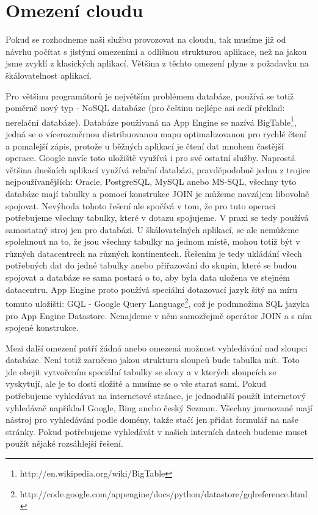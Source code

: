 \section{Omezení cloudu}
Pokud se rozhodneme naši službu provozovat na cloudu, tak musíme již od návrhu počítat s jistými omezeními a odlišnou strukturou aplikace, než na jakou jsme zvyklí z klasických aplikací. Většina z těchto omezení plyne z požadavku na škálovatelnost aplikací.

Pro většinu programátorů je největším problémem databáze, používá se totiž poměrně nový typ - NoSQL databáze (pro češtinu nejlépe asi sedí překlad: nerelační databáze). Databáze používaná na App Engine se nazívá BigTable\footnote{http://en.wikipedia.org/wiki/BigTable}, jedná se o vícerozměrnou distribuovanou mapu optimalizovanou pro rychlé čtení a pomalejší zápis, protože u běžných aplikací je čtení dat mnohem častější operace. Google navíc toto uložiště využívá i pro své ostatní služby. Naprostá většina dnešních aplikací využívá relační databázi, pravděpodobně jednu z trojice nejpoužívanějších: Oracle, PostgreSQL, MySQL anebo MS-SQL, všechny tyto databáze mají tabulky a pomocí konstrukce JOIN je můžeme navzájem libovolně spojovat. Nevýhoda tohoto řešení ale spočívá v tom, že pro tuto operaci potřebujeme všechny tabulky, které v dotazu spojujeme. V praxi se tedy používá samostatný stroj jen pro databázi. U škálovatelných aplikací, se ale nemůžeme spolehnout na to, že jsou všechny tabulky na jednom místě, mohou totiž být v různých datacentrech na různých kontinentech. Řešením je tedy ukládání všech potřebných dat do jedné tabulky anebo přiřazování do skupin, které se budou spojovat a databáze se sama postará o to, aby byla data uložena ve stejném datacentru. %
App Engine proto používá speciální dotazovací jazyk šitý na míru tomuto uložišti: GQL - Google Query Language\footnote{http://code.google.com/appengine/docs/python/datastore/gqlreference.html},
což je podmnožina SQL jazyka pro App Engine Datastore. Nenajdeme v něm samozřejmě operátor JOIN a s ním spojené konstrukce.

Mezi další omezení patří žádná anebo omezená možnost vyhledávání nad sloupci databáze. Není totiž zaručeno jakou strukturu sloupců bude tabulka mít. Toto jde obejít vytvořením speciální tabulky se slovy a v kterých sloupcích se vyskytují, ale je to dosti složité a musíme se o vše starat sami. Pokud potřebujeme vyhledávat na internetové stránce, je jednodušší použít internetový vyhledávač například Google, Bing anebo český Seznam. Všechny jmenované mají nástroj pro vyhledávání podle domény, takže stačí jen přidat formulář na naše stránky. Pokud potřebujeme vyhledávát v našich interních datech budeme muset použít nějaké rozsáhlejší řešení.


